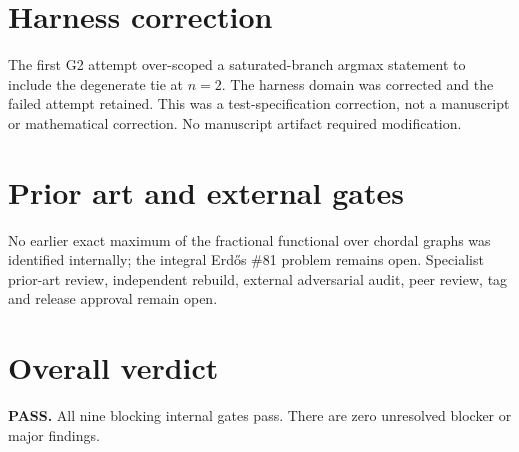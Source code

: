 \documentclass[11pt]{article}
\begin{document}
\section{\hspace{0.5em}Harness correction}
The first G2 attempt over-scoped a saturated-branch argmax statement to include
the degenerate tie at $n=2$. The harness domain was corrected and the failed
attempt retained. This was a test-specification correction, not a manuscript
or mathematical correction. No manuscript artifact required modification.

\section{Prior art and external gates}
No earlier exact maximum of the fractional functional over chordal graphs was
identified internally; the integral Erd\H{o}s \#81 problem remains open.
Specialist prior-art review, independent rebuild, external adversarial audit,
peer review, tag and release approval remain open.

\section{Overall verdict}
\textbf{PASS.} All nine blocking internal gates pass. There are zero unresolved
blocker or major findings.
\end{document}
